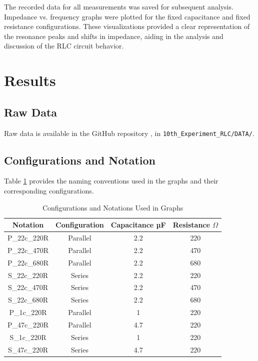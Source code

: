 \documentclass[journal]{IEEEtran}
\begin{document}
The recorded data for all measurements was saved for subsequent analysis. Impedance vs. frequency graphs were plotted for the fixed capacitance and fixed resistance configurations. These visualizations provided a clear representation of the resonance peaks and shifts in impedance, aiding in the analysis and discussion of the RLC circuit behavior.


\section{Results}

\subsection{Raw Data}
Raw data is available in the GitHub repository \cite{github}, in \verb|10th_Experiment_RLC/DATA/|.

\subsection{Configurations and Notation}
Table \ref{tab:configurations} provides the naming conventions used in the graphs and their corresponding configurations.

\begin{table}[H]
    \centering
    \caption{Configurations and Notations Used in Graphs}
    \label{tab:configurations}
    \begin{tabular}{cccc}
    \toprule
    \textbf{Notation} & \textbf{Configuration} & \textbf{Capacitance µF} &  \textbf{Resistance $\Omega$} \\
    \midrule
    P\_22c\_220R       & Parallel & 2.2 &220\\
    P\_22c\_470R       & Parallel & 2.2 &470\\
    P\_22c\_680R       & Parallel & 2.2 &680\\
    S\_22c\_220R       & Series & 2.2 &220\\
    S\_22c\_470R       & Series & 2.2 &470\\
    S\_22c\_680R       & Series & 2.2 &680\\
    P\_1c\_220R        & Parallel & 1 &220\\
    P\_47c\_220R       & Parallel & 4.7 &220\\
    S\_1c\_220R        & Series & 1 &220\\
    S\_47c\_220R       & Series & 4.7 &220\\
    \bottomrule
    \end{tabular}
\end{table}
\end{document}
